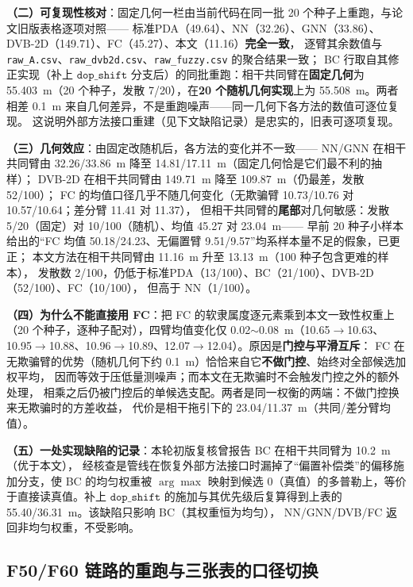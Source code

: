 \documentclass[UTF8,a4paper,zihao=-4]{ctexart}
\begin{document}
\textbf{（二）可复现性核对}：固定几何一栏由当前代码在同一批 20 个种子上重跑，与论文旧版表格逐项对照——
标准PDA（49.64）、NN（32.26）、GNN（33.86）、DVB-2D（149.71）、FC（45.27）、本文（11.16）\textbf{完全一致}，
逐臂其余数值与 \texttt{raw\_A.csv}、\texttt{raw\_dvb2d.csv}、\texttt{raw\_fuzzy.csv} 的聚合结果一致；
BC 行取自其修正实现（补上 \(\texttt{dop\_shift}\) 分支后）的同批重跑：相干共同臂在\textbf{固定几何}为 55.403~m（20 个种子，发散 7/20），在\textbf{20 个随机几何实现}上为 55.508~m。两者相差 0.1~m 来自几何差异，不是重跑噪声——同一几何下各方法的数值可逐位复现。
这说明外部方法接口重建（见下文缺陷记录）是忠实的，旧表可逐项复现。

\textbf{（三）几何效应}：由固定改随机后，各方法的变化并不一致——
NN/GNN 在相干共同臂由 32.26/33.86~m 降至 14.81/17.11~m（固定几何恰是它们最不利的抽样）；
DVB-2D 在相干共同臂由 149.71~m 降至 109.87~m（仍最差，发散 52/100）；
FC 的均值口径几乎不随几何变化（无欺骗臂 10.73/10.76 对 10.57/10.64；差分臂 11.41 对 11.37），
但相干共同臂的\textbf{尾部}对几何敏感：发散 5/20（固定）对 10/100（随机）、均值 45.27 对 23.04~m——
早前 20 种子小样本给出的“FC 均值 50.18/24.23、无偏置臂 9.51/9.57”均系样本量不足的假象，已更正；
本文方法在相干共同臂由 11.16~m 升至 13.13~m（100 种子包含更难的样本），
发散数 2/100，仍低于标准PDA（13/100）、BC（21/100）、DVB-2D（52/100）、FC（10/100），
但高于 NN（1/100）。

\textbf{（四）为什么不能直接用 FC}：把 FC 的软隶属度逐元素乘到本文一致性权重上
（20 个种子，逐种子配对），四臂均值变化仅 0.02$\sim$0.08~m（10.65$\to$10.63、
10.95$\to$10.88、10.96$\to$10.89、12.07$\to$12.04）。原因是\textbf{门控与平滑互斥}：
FC 在无欺骗臂的优势（随机几何下约 0.1~m）恰恰来自它\textbf{不做门控}、始终对全部候选加权平均，
因而等效于压低量测噪声；而本文在无欺骗时不会触发门控之外的额外处理，
相乘之后仍被门控后的单候选支配。两者是同一权衡的两端：不做门控换来无欺骗时的方差收益，
代价是相干拖引下的 23.04/11.37~m（共同/差分臂均值）。

\textbf{（五）一处实现缺陷的记录}：本轮初版复核曾报告 BC 在相干共同臂为 10.2~m（优于本文），
经核查是管线在恢复外部方法接口时漏掉了“偏置补偿类”的偏移施加分支，使 BC 的均匀权重被
\(\arg\max\) 映射到候选 0（真值）的多普勒上，等价于直接读真值。补上 \(\texttt{dop\_shift}\)
的施加与其优先级后复算得到上表的 55.40/36.31~m。该缺陷只影响 BC（其权重恒为均匀），
NN/GNN/DVB/FC 返回非均匀权重，不受影响。

\subsection{F50/F60 链路的重跑与三张表的口径切换}\label{sup:f50-rerun}
\end{document}
